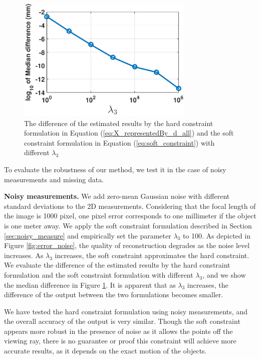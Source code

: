 \begin{figure}
\centering
\includegraphics[width=0.75\textwidth]{chapter5/resource/different_lambda.pdf}
\caption[Different between the hard constraint and the soft constraint parameterizations.]{The difference of the estimated results by the hard constraint formulation in Equation (\ref{eq:X_representedBy_d_all}) and the soft constraint formulation in Equation (\ref{eq:soft_constraint}) with different $\lambda_3$} 
\label{fig:soft_hard_diff}
\end{figure}

To evaluate the robustness of our method, we test it in the case of noisy measurements and missing data.

\textbf{Noisy measurements.} We add zero-mean Gaussian noise with different standard deviations to the 2D measurements. Considering that the focal length of the image is 1000 pixel, one pixel error corresponds to one millimeter if the object is one meter away.
We apply the soft constraint formulation described in Section \ref{sec:noisy_measure} and empirically set the parameter $\lambda_3$ to 100. As depicted in Figure \ref{fig:error_noise}, the quality of reconstruction degrades as the noise level increases. As $\lambda_3$ increases, the soft constraint approximates the hard constraint. %
We evaluate the difference of the estimated results by the hard constraint formulation and the soft constraint formulation with different $\lambda_3$, and we show the median difference in Figure \ref{fig:soft_hard_diff}. It is apparent that as $\lambda_3$ increases, the difference of the output between the two formulations becomes smaller.

We have tested the hard constraint formulation using noisy measurements, and the overall accuracy of the output is very similar. Though the soft constraint appears more robust in the presence of noise as it allows the points off the viewing ray, there is no guarantee or proof this constraint will achieve more accurate results, as it depends on the exact motion of the objects.


